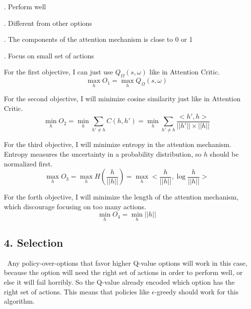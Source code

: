 \documentclass{article}
\begin{document}
	. Perform well
	
	. Different from other options
	
	. The components of the attention mechanism is close to 0 or 1
	
	. Focus on small set of actions
	
	\quad For the first objective, I can just use $Q_\Omega(s,\omega)$ like in Attention Critic. $$\max_h O_1=\max_h Q_\Omega(s,\omega)$$
	
	\quad For the second objective, I will minimize cosine similarity just like in Attention Critic.$$\min_h O_2 = \min_h \sum_{h' \neq h} C(h, h') = \min_h \sum_{h' \neq h} \frac{<h', h>}{||h'||\times||h||}$$
	
	\quad For the third objective, I will minimize entropy in the attention mechanism. Entropy measures the uncertainty in a probability distribution, so $h$ should be normalized first. $$\max_h O_3 = \max_h H(\frac{h}{||h||}) =\max_h <\frac{h}{||h||},\log \frac{h}{||h||}>$$
	
	\quad For the forth objective, I will minimize the length of the attention mechanism, which discourage focusing on too many actions. $$\min_h O_4 = \min_h ||h||$$
	
	\subsection*{4. Selection}
	\qquad \ Any policy-over-options that favor higher Q-value options will work in this case, because the option will need the right set of actions in order to perform well, or else it will fail horribly. So the Q-value already encoded which option has the right set of actions. This means that policies like $\epsilon$-greedy should work for this algorithm.
	
\end{document}

